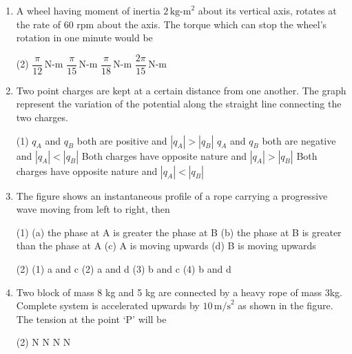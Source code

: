 \documentclass[twocolumn]{article}
\renewcommand{\frac}[2]{\dfrac{#1}{#2}}
\begin{document}
\begin{enumerate}
  \item 
  A wheel having moment of inertia \( 2 \, \text{kg-m}^2 \) about its vertical axis, rotates at the rate of 60 rpm about the axis. The torque which can stop the wheel’s rotation in one minute would be
  \begin{tasks}(2)
    \task \( \frac{\pi}{12} \, \text{N-m} \)
    \task \( \frac{\pi}{15} \, \text{N-m} \)
    \task \( \frac{\pi}{18} \, \text{N-m} \)
    \task \( \frac{2\pi}{15} \, \text{N-m} \)
  \end{tasks}

  \item Two point charges are kept at a certain distance from one another. The graph represent the variation of the potential along the straight line connecting the two charges.
  \begin{tasks}(1)
    \task \( q_A \) and \( q_B \) both are positive and \( |q_A| > |q_B| \)
    \task \( q_A \) and \( q_B \) both are negative and \( |q_A| < |q_B| \)
    \task Both charges have opposite nature and \( |q_A| > |q_B| \)
    \task Both charges have opposite nature and \( |q_A| < |q_B| \)
  \end{tasks}
  \begin{center}
  \end{center}

  \item 
  The figure shows an instantaneous profile of a rope carrying a progressive wave moving from left to right, then
  \begin{tasks}(1)
    \task (a) the phase at A is greater the phase at B
    \task (b) the phase at B is greater than the phase at A
    \task (c) A is moving upwards
    \task (d) B is moving upwards
  \end{tasks}
  \begin{tasks}(2)
    \task (1) a and c
    \task (2) a and d
    \task (3) b and c
    \task (4) b and d
  \end{tasks}
  \begin{center}
  \end{center}

  \item 
  Two block of mass 8 kg and 5 kg are connected by a heavy rope of mass 3kg. Complete system is accelerated upwards by \( 10 \, \text{m/s}^2 \) as shown in the figure. The tension at the point ‘P’ will be
  \begin{tasks}(2)
     N
     N
     N
     N
  \end{tasks}
  \begin{center}
  \end{center}



\end{enumerate}
\end{document}
